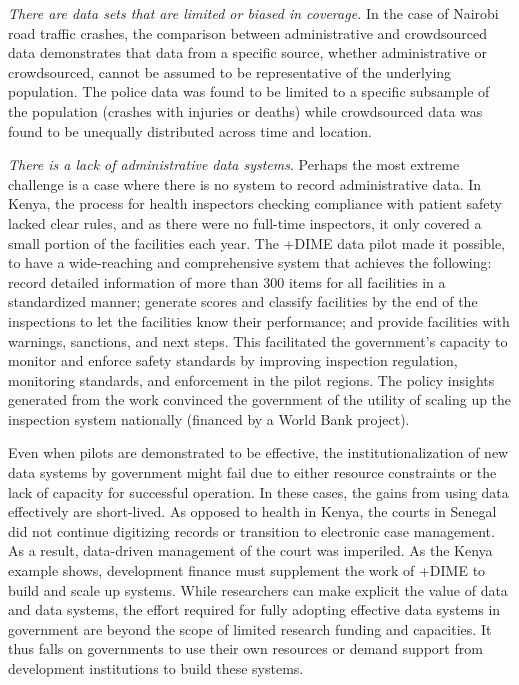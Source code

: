 \documentclass[
]{WileySix}
\begin{document}
\emph{There are data sets that are limited or biased in coverage.} In the case of Nairobi road traffic crashes, the comparison between administrative and crowdsourced data demonstrates that data from a specific source, whether administrative or crowdsourced, cannot be assumed to be representative of the underlying population. The police data was found to be limited to a specific subsample of the population (crashes with injuries or deaths) while crowdsourced data was found to be unequally distributed across time and location.

\emph{There is a lack of administrative data systems}. Perhaps the most extreme challenge is a case where there is no system to record administrative data. In Kenya, the process for health inspectors checking compliance with patient safety lacked clear rules, and as there were no full-time inspectors, it only covered a small portion of the facilities each year. The +DIME\textbar{} data pilot made it possible, to have a wide-reaching and comprehensive system that achieves the following: record detailed information of more than 300 items for all facilities in a standardized manner; generate scores and classify facilities by the end of the inspections to let the facilities know their performance; and provide facilities with warnings, sanctions, and next steps. This facilitated the government's capacity to monitor and enforce safety standards by improving inspection regulation, monitoring standards, and enforcement in the pilot regions. The policy insights generated from the work convinced the government of the utility of scaling up the inspection system nationally (financed by a World Bank project).

Even when pilots are demonstrated to be effective, the institutionalization of new data systems by government might fail due to either resource constraints or the lack of capacity for successful operation. In these cases, the gains from using data effectively are short-lived. As opposed to health in Kenya, the courts in Senegal did not continue digitizing records or transition to electronic case management. As a result, data-driven management of the court was imperiled. As the Kenya example shows, development finance must supplement the work of +DIME\textbar{} to build and scale up systems. While researchers can make explicit the value of data and data systems, the effort required for fully adopting effective data systems in government are beyond the scope of limited research funding and capacities. It thus falls on governments to use their own resources or demand support from development institutions to build these systems.
\end{document}
